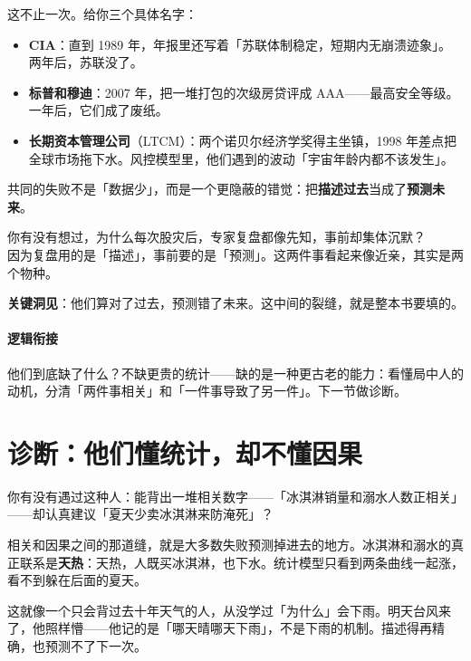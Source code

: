 \documentclass[../../main2.tex]{subfiles}
\begin{document}
这不止一次。给你三个具体名字：

\begin{itemize}
	\item \textbf{CIA}：直到 1989 年，年报里还写着「苏联体制稳定，短期内无崩溃迹象」。两年后，苏联没了。
	\item \textbf{标普和穆迪}：2007 年，把一堆打包的次级房贷评成 AAA——最高安全等级。一年后，它们成了废纸。
	\item \textbf{长期资本管理公司}（LTCM）：两个诺贝尔经济学奖得主坐镇，1998 年差点把全球市场拖下水。风控模型里，他们遇到的波动「宇宙年龄内都不该发生」。
\end{itemize}

共同的失败不是「数据少」，而是一个更隐蔽的错觉：把\textbf{描述过去}当成了\textbf{预测未来}。

\begin{readingnote}
	你有没有想过，为什么每次股灾后，专家复盘都像先知，事前却集体沉默？\\
	因为复盘用的是「描述」，事前要的是「预测」。这两件事看起来像近亲，其实是两个物种。
\end{readingnote}

\textbf{\Large 关键洞见}：他们算对了过去，预测错了未来。这中间的裂缝，就是整本书要填的。

\paragraph*{逻辑衔接}
	他们到底缺了什么？不缺更贵的统计——缺的是一种更古老的能力：看懂局中人的动机，分清「两件事相关」和「一件事导致了另一件」。下一节做诊断。

\section{诊断：他们懂统计，却不懂因果}

你有没有遇过这种人：能背出一堆相关数字——「冰淇淋销量和溺水人数正相关」——却认真建议「夏天少卖冰淇淋来防淹死」？

相关和因果之间的那道缝，就是大多数失败预测掉进去的地方。冰淇淋和溺水的真正联系是\textbf{天热}：天热，人既买冰淇淋，也下水。统计模型只看到两条曲线一起涨，看不到躲在后面的夏天。

\begin{tcolorbox}[colback=green!5, title=\textit{生活类比}]
	这就像一个只会背过去十年天气的人，从没学过「为什么」会下雨。明天台风来了，他照样懵——他记的是「哪天晴哪天下雨」，不是下雨的机制。描述得再精确，也预测不了下一次。
\end{tcolorbox}
\end{document}
